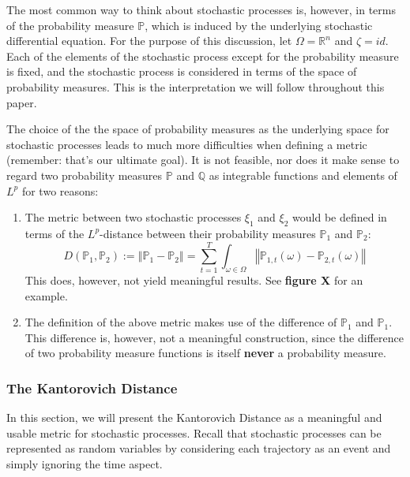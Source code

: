 \documentclass[a4paper, 12pt] {article}
\begin{document}
The most common way to think about stochastic processes is, however, in terms of the probability measure $\mathbb{P}$, which is induced by the underlying stochastic differential equation. For the purpose of this discussion, let $\Omega=\mathbb{R}^n$ and $\zeta=id$. Each of the elements of the stochastic process except for the probability measure is fixed, and the stochastic process is considered in terms of the space of probability measures. This is the interpretation we will follow throughout this paper.

The choice of the the space of probability measures as the underlying space for stochastic processes leads to much more difficulties when defining a metric (remember: that's our ultimate goal). It is not feasible, nor does it make sense to regard two probability measures $\mathbb{P}$ and $\mathbb{Q}$ as integrable functions and elements of $L^p$ for two reasons:
\begin{enumerate}
\item The metric between two stochastic processes $\xi_1$ and $\xi_2$ would be defined in terms of the $L^p$-distance between their probability measures $\mathbb{P}_1$ and $\mathbb{P}_2$:
  \begin{equation}
    \label{eq:prob-measure-metric-as-Lpnorm}
    D(\mathbb{P}_1,\mathbb{P}_2) := \left\Vert \mathbb{P}_1-\mathbb{P}_2\right\Vert = \sum_{t=1}^T\int_{\omega\in\Omega}\left\Vert \mathbb{P}_{1,t}(\omega)-\mathbb{P}_{2,t}(\omega)\right\Vert
  \end{equation}
  This does, however, not yield meaningful results. See \textbf{figure X} for an example.
 \item The definition of the above metric makes use of the difference of $\mathbb{P}_1$ and $\mathbb{P}_1$. This difference is, however, not a meaningful construction, since the difference of two probability measure functions is itself \textbf{never} a probability measure.
\end{enumerate}
\subsubsection{The Kantorovich Distance}
In this section, we will present the Kantorovich Distance as a meaningful and usable metric for stochastic processes. Recall that stochastic processes can be represented as random variables by considering each trajectory as an event and simply ignoring the time aspect.
\end{document}
